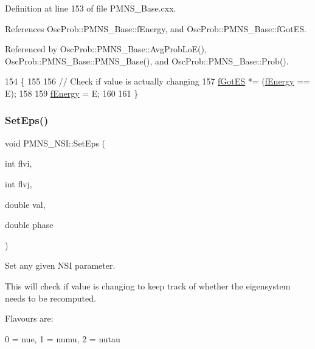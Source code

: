 Definition at line 153 of file P\+M\+N\+S\+\_\+\+Base.\+cxx.



References Osc\+Prob\+::\+P\+M\+N\+S\+\_\+\+Base\+::f\+Energy, and Osc\+Prob\+::\+P\+M\+N\+S\+\_\+\+Base\+::f\+Got\+ES.



Referenced by Osc\+Prob\+::\+P\+M\+N\+S\+\_\+\+Base\+::\+Avg\+Prob\+Lo\+E(), Osc\+Prob\+::\+P\+M\+N\+S\+\_\+\+Base\+::\+P\+M\+N\+S\+\_\+\+Base(), and Osc\+Prob\+::\+P\+M\+N\+S\+\_\+\+Base\+::\+Prob().


\begin{DoxyCode}
154 \{
155 
156   \textcolor{comment}{// Check if value is actually changing}
157   \hyperlink{classOscProb_1_1PMNS__Base_a6dc5cd010d2d70b2324745b4e53e9839}{fGotES} *= (\hyperlink{classOscProb_1_1PMNS__Base_a2800af6d436972f3e900867790c046b0}{fEnergy} == E);
158 
159   \hyperlink{classOscProb_1_1PMNS__Base_a2800af6d436972f3e900867790c046b0}{fEnergy} = E;
160 
161 \}
\end{DoxyCode}
\mbox{\label{classOscProb_1_1PMNS__NSI_a87c508149ea36b6de493a6817247a0ea}} 
\subsubsection{\texorpdfstring{Set\+Eps()}{SetEps()}}
{\footnotesize\ttfamily void P\+M\+N\+S\+\_\+\+N\+S\+I\+::\+Set\+Eps (\begin{DoxyParamCaption}\item[{int}]{flvi,  }\item[{int}]{flvj,  }\item[{double}]{val,  }\item[{double}]{phase }\end{DoxyParamCaption})\hspace{0.3cm}{\ttfamily [virtual]}}

Set any given N\+SI parameter.

This will check if value is changing to keep track of whether the eigensystem needs to be recomputed.

Flavours are\+:~\newline

\begin{DoxyItemize}
\item 0 = nue, 1 = numu, 2 = nutau
\end{DoxyItemize}

